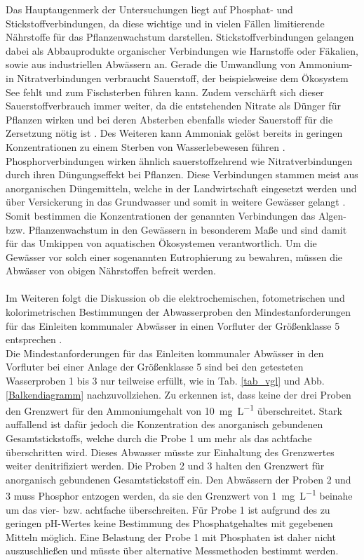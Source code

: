\newpage
Das Hauptaugenmerk der Untersuchungen liegt auf Phosphat- und Stickstoffverbindungen, da diese wichtige und in vielen Fällen limitierende Nährstoffe für das Pflanzenwachstum darstellen.
Stickstoffverbindungen gelangen dabei als Abbauprodukte organischer Verbindungen wie Harnstoffe oder Fäkalien, sowie aus industriellen Abwässern an. Gerade die Umwandlung von Ammonium- in Nitratverbindungen verbraucht Sauerstoff, der beispielsweise dem Ökosystem See fehlt und zum Fischsterben führen kann. Zudem verschärft sich dieser Sauerstoffverbrauch immer weiter, da die entstehenden Nitrate als Dünger für Pflanzen wirken und bei deren Absterben ebenfalls wieder Sauerstoff für die Zersetzung nötig ist \cite{NundP}. Des Weiteren kann Ammoniak gelöst bereits in geringen Konzentrationen zu einem Sterben von Wasserlebewesen führen \cite{AnalyseAbwasserN}. \linebreak
Phosphorverbindungen wirken ähnlich sauerstoffzehrend wie Nitratverbindungen durch ihren Düngungseffekt bei Pflanzen. Diese Verbindungen stammen meist aus anorganischen Düngemitteln, welche in der Landwirtschaft eingesetzt werden und über Versickerung in das Grundwasser und somit in weitere Gewässer gelangt \cite{NundP,AnalyseAbwasserP}. \linebreak
Somit bestimmen die Konzentrationen der genannten Verbindungen das Algen- bzw. Pflanzenwachstum in den Gewässern in besonderem Maße und sind damit für das Umkippen von aquatischen Ökosystemen verantwortlich. Um die Gewässer vor solch einer sogenannten Eutrophierung zu bewahren, müssen die Abwässer von obigen Nährstoffen befreit werden.\\\\
Im Weiteren folgt die Diskussion ob die elektrochemischen, fotometrischen und kolorimetrischen Bestimmungen der Abwasserproben den Mindestanforderungen für das Einleiten kommunaler Abwässer in einen Vorfluter der Größenklasse 5 entsprechen \cite[S. 29]{Skript}.\\
Die Mindestanforderungen für das Einleiten kommunaler Abwässer in den Vorfluter bei einer Anlage der Größenklasse 5 sind bei den getesteten Wasserproben 1 bis 3 nur teilweise erfüllt, wie in Tab. \ref{tab_vgl} und Abb. \ref{Balkendiagramm} nachzuvollziehen. Zu erkennen ist, dass keine der drei Proben den Grenzwert für den Ammoniumgehalt von \SI{10}{\milli \gram \per \liter} überschreitet. Stark auffallend ist dafür jedoch die Konzentration des anorganisch gebundenen Gesamtstickstoffs, welche durch die Probe 1 um mehr als das achtfache überschritten wird. Dieses Abwasser müsste zur Einhaltung des Grenzwertes weiter denitrifiziert werden. Die Proben 2 und 3 halten den Grenzwert für anorganisch gebundenen Gesamtstickstoff ein. Den Abwässern der Proben 2 und 3 muss Phosphor entzogen werden, da sie den Grenzwert von \SI{1}{\milli\gram\per\liter} beinahe um das vier- bzw. achtfache überschreiten. Für Probe 1 ist aufgrund des zu geringen pH-Wertes keine Bestimmung des Phosphatgehaltes mit gegebenen Mitteln möglich. Eine Belastung der Probe 1 mit Phosphaten ist daher nicht auszuschließen und müsste über alternative Messmethoden bestimmt werden.\\
